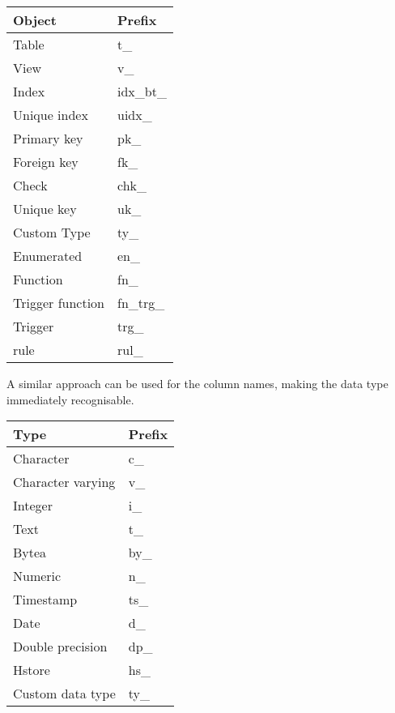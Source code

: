 \begin{table}[H]
\begin{tabular}{ll}
 \textbf{Object} & \textbf{Prefix}  \\
 \hline
 Table & t\_ \\
 View & v\_ \\
Index & idx\_bt\_ \\
Unique index & uidx\_ \\
Primary key & pk\_ \\
Foreign key & fk\_ \\
Check & chk\_ \\
Unique key & uk\_ \\
Custom Type & ty\_ \\
Enumerated & en\_ \\
Function & fn\_ \\
Trigger function & fn\_trg\_ \\
Trigger & trg\_ \\
rule & rul\_ \\

\end{tabular}
\end{table}


A similar approach can be used for the column names, making the data type immediately recognisable.

\begin{table}[H]
\begin{tabular}{ll}
 \textbf{Type} & \textbf{Prefix}  \\
 \hline
 Character & c\_ \\
 Character varying & v\_ \\
Integer & i\_ \\
Text & t\_ \\
Bytea & by\_ \\
Numeric & n\_ \\
Timestamp & ts\_ \\
Date & d\_ \\
Double precision & dp\_ \\
Hstore & hs\_ \\
Custom data type & ty\_ \\

\end{tabular}
\end{table}



